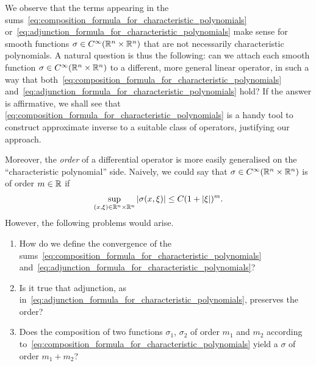 We observe that
the terms appearing in the sums~\eqref{eq:composition_formula_for_characteristic_polynomials} or~\eqref{eq:adjunction_formula_for_characteristic_polynomials} make sense for smooth functions $\sigma \in {C^\infty(\mathbb{R}^n \times \mathbb{R}^n)}$ that are not necessarily characteristic polynomials.
A natural question is thus the following:
can we attach each smooth function $\sigma \in {C^\infty(\mathbb{R}^n \times \mathbb{R}^n)}$ to a different, more general linear operator,
in such a way that both~\eqref{eq:composition_formula_for_characteristic_polynomials} and~\eqref{eq:adjunction_formula_for_characteristic_polynomials} hold?
If the answer is affirmative,
we shall see that
\eqref{eq:composition_formula_for_characteristic_polynomials} is a handy tool to construct approximate inverse to a suitable class of operators,
justifying our approach.

Moreover,
the \emph{order} of a differential operator is more easily generalised on the ``characteristic polynomial'' side.
Naively, we could say that $\sigma \in {C^\infty(\mathbb{R}^n \times \mathbb{R}^n)}$ is of order $m \in \mathbb{R}$ if
\begin{align*}
    \sup_{(x, \xi) \in \mathbb{R}^n \times \mathbb{R}^n} \left|{\sigma(x, \xi)}\right| \leq C (1 + \left|{\xi}\right|)^m.
\end{align*}
However,
the following problems would arise.
\begin{enumerate}
    \item How do we define the convergence of the sums~\eqref{eq:composition_formula_for_characteristic_polynomials} and~\eqref{eq:adjunction_formula_for_characteristic_polynomials}?
    \item Is it true that adjunction, as in~\eqref{eq:adjunction_formula_for_characteristic_polynomials}, preserves the order?
    \item Does the composition of two functions $\sigma_1$, $\sigma_2$ of order $m_1$ and $m_2$ according to~\eqref{eq:composition_formula_for_characteristic_polynomials} yield a $\sigma$ of order $m_1 + m_2$?
\end{enumerate}

